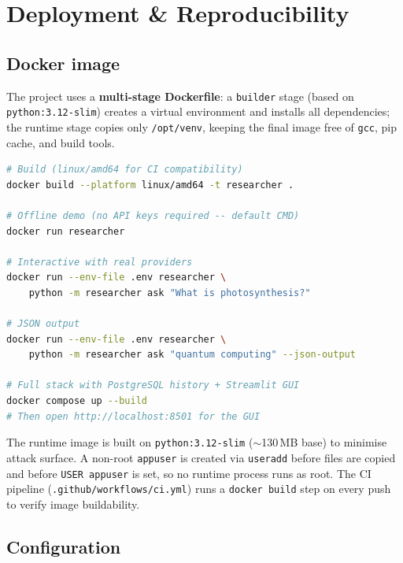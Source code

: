 \documentclass[11pt,a4paper]{article}
\begin{document}
\section{Deployment \& Reproducibility}\label{sec:deploy}

\subsection{Docker image}

The project uses a \textbf{multi-stage Dockerfile}: a \texttt{builder} stage (based on
\texttt{python:3.12-slim}) creates a virtual environment and installs all dependencies;
the runtime stage copies only \texttt{/opt/venv}, keeping the final image free of
\texttt{gcc}, pip cache, and build tools.

\begin{lstlisting}[style=python, language=bash, numbers=none,
  caption={Build and run commands}]
# Build (linux/amd64 for CI compatibility)
docker build --platform linux/amd64 -t researcher .

# Offline demo (no API keys required -- default CMD)
docker run researcher

# Interactive with real providers
docker run --env-file .env researcher \
    python -m researcher ask "What is photosynthesis?"

# JSON output
docker run --env-file .env researcher \
    python -m researcher ask "quantum computing" --json-output

# Full stack with PostgreSQL history + Streamlit GUI
docker compose up --build
# Then open http://localhost:8501 for the GUI
\end{lstlisting}

The runtime image is built on \texttt{python:3.12-slim} ($\sim$130\,MB base) to
minimise attack surface. A non-root \texttt{appuser} is created via \texttt{useradd}
before files are copied and before \texttt{USER appuser} is set, so no runtime process
runs as root. The CI pipeline (\texttt{.github/workflows/ci.yml}) runs a
\texttt{docker build} step on every push to verify image buildability.

\subsection{Configuration}
\end{document}
